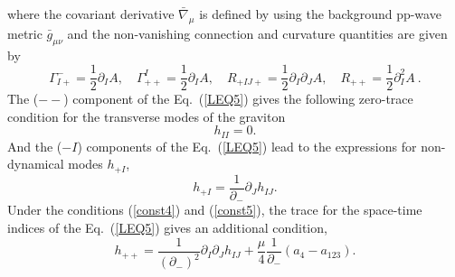 \documentclass[a4paper,12pt]{article}
\numberwithin{equation}{section}
\begin{document}
where the covariant derivative $\bar\nabla_\mu$ is defined by using
the background pp-wave metric $\bar g_{\mu\nu}$ and the non-vanishing
connection and curvature quantities are given by
\begin{equation}
\Gamma^-_{I+} = \frac{1}{2} \partial_I A,\quad
\Gamma^I_{++} = \frac{1}{2} \partial_I A,\quad
R_{+IJ+} = \frac{1}{2} \partial_I \partial_J A, \quad
R_{++} = \frac{1}{2} \partial^2_I A ~.
\label{CC}
\end{equation}
The ($--$) component of the Eq.~(\ref{LEQ5}) gives the following
zero-trace condition for the transverse modes of the graviton
\begin{equation}\label{const4}
h_{II} = 0.
\end{equation}
And the ($-I$) components of the Eq.~(\ref{LEQ5}) lead to the
expressions for non-dynamical modes $h_{+I}$,
\begin{equation}\label{const5}
 h_{+I} = \frac1{\partial_-}  \partial_J h_{IJ}.
\end{equation}
Under the conditions (\ref{const4}) and (\ref{const5}), the trace for
the space-time indices of the Eq.~(\ref{LEQ5}) gives an additional
condition,
\begin{equation}\label{const6}
h_{++} = \frac1{(\partial_-)^2} \partial_I  \partial_J h_{IJ}
 + \frac{\mu}4  \frac1{\partial_-}(a_4 - a_{123}).
\end{equation}
\end{document}
